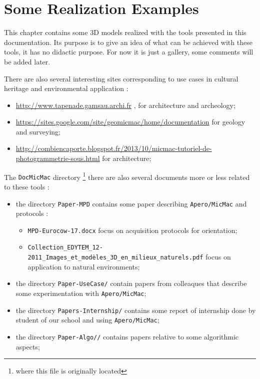 \chapter{Some Realization Examples}


This chapter contains some 3D models realized with the tools presented
in this documentation. Its purpose is to give an idea of what can be achieved with these tools, 
it has no didactic purpose.  
For now it is just a gallery, some comments will be added later.

There are also several interesting sites corresponding to use
cases in cultural heritage and environmental application :

\begin{itemize}
   \item \url{http://www.tapenade.gamsau.archi.fr} , for architecture and 
         archeology;

   \item \url{https://sites.google.com/site/geomicmac/home/documentation}
         for geology and surveying;

   \item \url{ http://combiencaporte.blogspot.fr/2013/10/micmac-tutoriel-de-photogrammetrie-sous.html}
         for architecture;
\end{itemize}

The {\tt DocMicMac} directory \footnote{where this file  is originally located}
there are also several documents more or less related to these tools :

\begin{itemize}
   \item  the directory {\tt Paper-MPD} contains some paper describing {\tt Apero/MicMac}
          and protocols :

          \begin{itemize}
              \item {\tt MPD-Eurocow-17.docx} focus on acquisition protocols for orientation;
              \item {\tt Collection\_EDYTEM\_12-2011\_Images\_et\_modèles\_3D\_en\_milieux\_naturels.pdf} 
                    focus on application to natural environments;
          \end{itemize}

   \item  the directory {\tt Paper-UseCase/} contain papers from colleaques that describe some
          experimentation with {\tt Apero/MicMac};

   \item  the directory {\tt Papers-Internship/} contains some report of internship done
          by student of our school and using {\tt Apero/MicMac};

   \item  the directory {\tt Paper-Algo//} contains papers relative to some algorithmic aspects;
\end{itemize}

